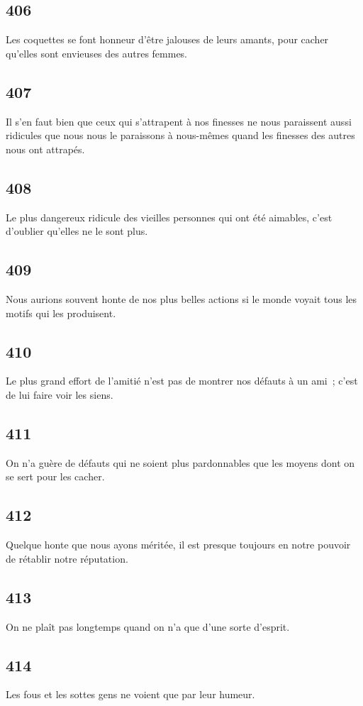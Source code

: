 \documentclass[french,twoside]{book} %
\begin{document}
\subsection[{406}]{ \textsc{406} }
\noindent Les coquettes se font honneur d’être jalouses de leurs amants, pour cacher qu’elles sont envieuses des autres femmes.
\subsection[{407}]{ \textsc{407} }
\noindent Il s’en faut bien que ceux qui s’attrapent à nos finesses ne nous paraissent aussi ridicules que nous nous le paraissons à nous-mêmes quand les finesses des autres nous ont attrapés.
\subsection[{408}]{ \textsc{408} }
\noindent Le plus dangereux ridicule des vieilles personnes qui ont été aimables, c’est d’oublier qu’elles ne le sont plus.
\subsection[{409}]{ \textsc{409} }
\noindent Nous aurions souvent honte de nos plus belles actions si le monde voyait tous les motifs qui les produisent.
\subsection[{410}]{ \textsc{410} }
\noindent Le plus grand effort de l’amitié n’est pas de montrer nos défauts à un ami ; c’est de lui faire voir les siens.
\subsection[{411}]{ \textsc{411} }
\noindent On n’a guère de défauts qui ne soient plus pardonnables que les moyens dont on se sert pour les cacher.
\subsection[{412}]{ \textsc{412} }
\noindent Quelque honte que nous ayons méritée, il est presque toujours en notre pouvoir de rétablir notre réputation.
\subsection[{413}]{ \textsc{413} }
\noindent On ne plaît pas longtemps quand on n’a que d’une sorte d’esprit.
\subsection[{414}]{ \textsc{414} }
\noindent Les fous et les sottes gens ne voient que par leur humeur.
\end{document}
